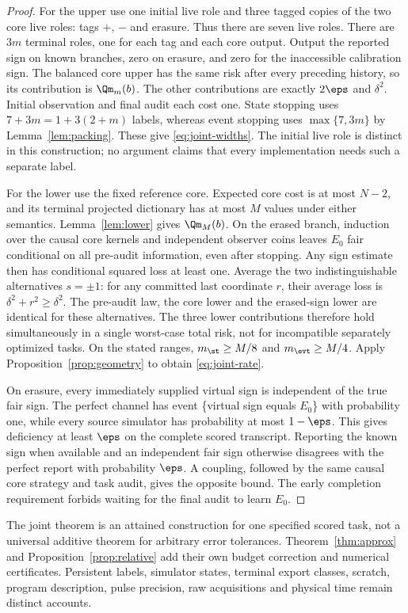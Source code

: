 \begin{proof}
For the upper use one initial live role and three tagged copies of the two core live roles: tags $+$, $-$ and erasure. Thus there are seven live roles. There are $3m$ terminal roles, one for each tag and each core output. Output the reported sign on known branches, zero on erasure, and zero for the inaccessible calibration sign. The balanced core upper has the same risk after every preceding history, so its contribution is $\Qm_m(b)$. The other contributions are exactly $2\eps$ and $\delta^2$. Initial observation and final audit each cost one. State stopping uses $7+3m=1+3(2+m)$ labels, whereas event stopping uses $\max\{7,3m\}$ by Lemma~\ref{lem:packing}. These give \eqref{eq:joint-widths}. The initial live role is distinct in this construction; no argument claims that every implementation needs such a separate label.

For the lower use the fixed reference core. Expected core cost is at most $N-2$, and its terminal projected dictionary has at most $M$ values under either semantics. Lemma~\ref{lem:lower} gives $\Qm_M(b)$. On the erased branch, induction over the causal core kernels and independent observer coins leaves $E_0$ fair conditional on all pre-audit information, even after stopping. Any sign estimate then has conditional squared loss at least one. Average the two indistinguishable alternatives $s=\pm1$: for any committed last coordinate $r$, their average loss is $\delta^2+r^2\ge\delta^2$. The pre-audit law, the core lower and the erased-sign lower are identical for these alternatives. The three lower contributions therefore hold simultaneously in a single worst-case total risk, not for incompatible separately optimized tasks. On the stated ranges, $m_\st\ge M/8$ and $m_\evt\ge M/4$. Apply Proposition~\ref{prop:geometry} to obtain \eqref{eq:joint-rate}.

On erasure, every immediately supplied virtual sign is independent of the true fair sign. The perfect channel has event \{virtual sign equals $E_0$\} with probability one, while every source simulator has probability at most $1-\eps$. This gives deficiency at least $\eps$ on the complete scored transcript. Reporting the known sign when available and an independent fair sign otherwise disagrees with the perfect report with probability $\eps$. A coupling, followed by the same causal core strategy and task audit, gives the opposite bound. The early completion requirement forbids waiting for the final audit to learn $E_0$.
\end{proof}

The joint theorem is an attained construction for one specified scored task, not a universal additive theorem for arbitrary error tolerances. Theorem~\ref{thm:approx} and Proposition~\ref{prop:relative} add their own budget correction and numerical certificates. Persistent labels, simulator states, terminal export classes, scratch, program description, pulse precision, raw acquisitions and physical time remain distinct accounts.
